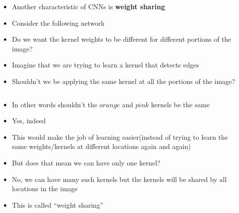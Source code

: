 \begin{frame}
	\begin{columns}
		\begin{column}{0.6\textwidth}
			
		\end{column}
		\begin{column}{0.4\textwidth}
			\begin{itemize}
				\justifying
				\setlength\itemsep{1em}
				\item<1-> Another characteristic of CNNs is \textbf{weight sharing}
				\item<2-> Consider the following network
				\item<4-> Do we want the kernel weights to be different for different portions of the image?
				\item<5-> Imagine that we are trying to learn a kernel that detects edges
				\item<6-> Shouldn't we be applying the same kernel at all the portions of the image?
				                
			\end{itemize}
		\end{column}
	\end{columns}
\end{frame}


\begin{frame}
	\begin{columns}
		\begin{column}{0.5\textwidth}
			
		\end{column}
		\begin{column}{0.5\textwidth}
			\begin{itemize}
				\justifying
				\setlength\itemsep{1em}
				\item<1-> In other words shouldn't the $orange$ and $pink$ kernels be the same 
				\item<2-> Yes, indeed
				\item<4-> This would make the job of learning easier(instead of trying to learn the same weights/kernels at different locations again and again)
				\item<5-> But does that mean we can have only one kernel?
				\item<6-> No, we can have many such kernels but the kernels will be shared by all locations in the image
				\item<9-> This is called ``weight sharing''
			\end{itemize}
		\end{column}
	\end{columns}
\end{frame}

